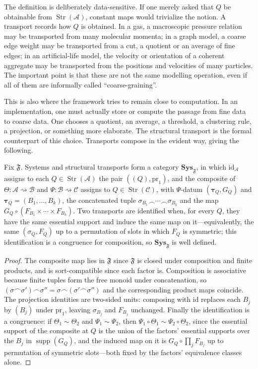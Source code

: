\documentclass[runningheads]{llncs}
\newcommand{\Str}{\operatorname{Str}}
\newcommand{\supp}{\operatorname{supp}}
\begin{document}
The definition is deliberately data-sensitive. If one merely asked that $Q$ be obtainable from $\Str(\mathcal A)$, constant maps would trivialize the notion. A transport records how $Q$ is obtained. In a gas, a macroscopic pressure relation may be transported from many molecular momenta; in a graph model, a coarse edge weight may be transported from a cut, a quotient or an average of fine edges; in an artificial-life model, the velocity or orientation of a coherent aggregate may be transported from the positions and velocities of many particles. The important point is that these are not the same modelling operation, even if all of them are informally called ``coarse-graining''.

This is also where the framework tries to remain close to computation. In an implementation, one must actually store or compute the passage from fine data to coarse data. One chooses a quotient, an average, a threshold, a clustering rule, a projection, or something more elaborate. The structural transport is the formal counterpart of this choice. Transports compose in the evident way, giving the following.

\begin{proposition}\label{prop::cat}
Fix $\mathfrak F$. Systems and structural transports form a category $\mathbf{Sys}_{\mathfrak F}$, in which $\mathrm{id}_{\mathcal A}$ assigns to each $Q\in\Str(\mathcal A)$ the pair $((Q),\mathrm{pr}_1)$, and the composite of $\Theta:\mathcal A\rightsquigarrow\mathcal B$ and $\Psi:\mathcal B\rightsquigarrow\mathcal C$ assigns to $Q\in\Str(\mathcal C)$, with $\Psi$-datum $(\boldsymbol\tau_Q,G_Q)$ and $\boldsymbol\tau_Q=(B_1,\dots,B_k)$, the concatenated tuple $\sigma_{B_1}\frown\cdots\frown\sigma_{B_k}$ and the map $G_Q\circ(F_{B_1}\times\cdots\times F_{B_k})$. Two transports are identified when, for every $Q$, they have the same essential support and induce the same map on it---equivalently, the same $(\sigma_Q,F_Q)$ up to a permutation of slots in which $F_Q$ is symmetric; this identification is a congruence for composition, so $\mathbf{Sys}_{\mathfrak F}$ is well defined.
\end{proposition}
\begin{proof}
The composite map lies in $\mathfrak F$ since $\mathfrak F$ is closed under composition and finite products, and is sort-compatible since each factor is. Composition is associative because finite tuples form the free monoid under concatenation, so $(\sigma\frown\sigma')\frown\sigma''=\sigma\frown(\sigma'\frown\sigma'')$ and the corresponding product maps coincide. The projection identities are two-sided units: composing with $\mathrm{id}$ replaces each $B_j$ by $(B_j)$ under $\mathrm{pr}_1$, leaving $\sigma_{B_j}$ and $F_{B_j}$ unchanged. Finally the identification is a congruence: if $\Theta_1\sim\Theta_2$ and $\Psi_1\sim\Psi_2$, then $\Psi_1\circ\Theta_1\sim\Psi_2\circ\Theta_2$, since the essential support of the composite at $Q$ is the union of the factors' essential supports over the $B_j$ in $\supp(G_Q)$, and the induced map on it is $G_Q\circ\prod_j F_{B_j}$ up to permutation of symmetric slots---both fixed by the factors' equivalence classes alone.
\end{proof}
\end{document}
